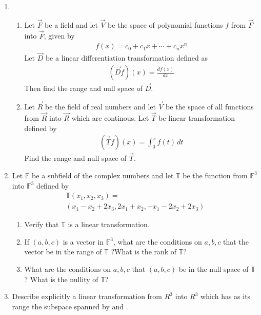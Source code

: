 \begin{enumerate}[label=\thesubsection.\arabic*.,ref=\thesubsection.\theenumi]
\item \begin{enumerate}[label=\emph{\alph*)}]
\item
Let $\vec{F}$ be a field and let $\vec{V}$ be the space of polynomial functions $f$ from $\vec{F}$
into $\vec{F}$, given by
\begin{align*}
	f(x)=c_0+c_1x+\cdots +c_nx^n
\end{align*}
Let $\vec{D}$ be a linear differentiation transformation defined as
\begin{align*}
	(\vec{D}f)(x)=\frac{df(x)}{dx}
\end{align*}
Then find the range and null space of 
$\vec{D}$.\\
\item
Let $\vec{R}$ be the field of real numbers and let $\vec{V}$ be the space of all functions from 
$\vec{R}$ into $\vec{R}$ which are continous. Let $\vec{T}$ be linear transformation defined by
\begin{align*}
	(\vec{T}f)(x)=\int_{0}^{x} f(t)\,dt
\end{align*}
Find the range and null space of $\vec{T}$.
\end{enumerate}
%
\solution

%
\item Let $\mathbb{F}$ be a subfield of the complex numbers and let $\mathbb{T}$ be the function from $\mathbb{F}^3$ into $\mathbb{F}^3$ defined by 
\begin{align}
    \mathbb{T}(x_1,x_2,x_3)=\\(x_1-x_2+2x_3,2x_1+x_2,-x_1-2x_2+2x_3)
\end{align}
\begin{enumerate}
\item  Verify that $\mathbb{T}$ is a linear transformation.\\
\item  If $(a,b,c)$ is a vector in  $\mathbb{F}^3$, what are the conditions on $a,b,c$ that the vector be in the range of  $\mathbb{T}$ ?What is the rank of  $\mathbb{T}$?\\
\item  What are the conditions on $a,b,c$ that $(a,b,c)$ be in the null space of  
$\mathbb{T}$? What is the nullity of  $\mathbb{T}$?
\end{enumerate}
\solution

\item Describe explicitly a linear transformation from $R^{3}$ into $R^{3}$ which has as its range the subspace spanned by  and .  

\end{enumerate}
